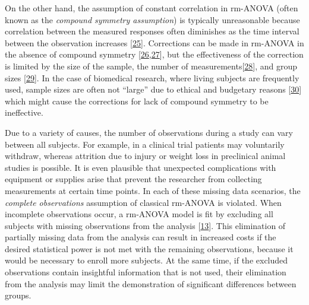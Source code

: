 \documentclass[
]{article}
\begin{document}
On the other hand, the assumption of constant correlation in rm-ANOVA (often known as the \emph{compound symmetry assumption}) is typically unreasonable because correlation between the measured responses often diminishes as the time interval between the observation increases {[}\protect\hyperlink{ref-ugrinowitsch2004}{25}{]}. Corrections can be made in rm-ANOVA in the absence of compound symmetry {[}\protect\hyperlink{ref-huynh1976}{26},\protect\hyperlink{ref-greenhouse1959}{27}{]}, but the effectiveness of the correction is limited by the size of the sample, the number of measurements{[}\protect\hyperlink{ref-haverkamp2017}{28}{]}, and group sizes {[}\protect\hyperlink{ref-keselman2001}{29}{]}. In the case of biomedical research, where living subjects are frequently used, sample sizes are often not ``large'' due to ethical and budgetary reasons {[}\protect\hyperlink{ref-charan2013}{30}{]} which might cause the corrections for lack of compound symmetry to be ineffective.

Due to a variety of causes, the number of observations during a study can vary between all subjects. For example, in a clinical trial patients may voluntarily withdraw, whereas attrition due to injury or weight loss in preclinical animal studies is possible. It is even plausible that unexpected complications with equipment or supplies arise that prevent the researcher from collecting measurements at certain time points. In each of these missing data scenarios, the \emph{complete observations} assumption of classical rm-ANOVA is violated. When incomplete observations occur, a rm-ANOVA model is fit by excluding all subjects with missing observations from the analysis {[}\protect\hyperlink{ref-gueorguieva2004}{13}{]}. This elimination of partially missing data from the analysis can result in increased costs if the desired statistical power is not met with the remaining observations, because it would be necessary to enroll more subjects. At the same time, if the excluded observations contain insightful information that is not used, their elimination from the analysis may limit the demonstration of significant differences between groups.
\end{document}
